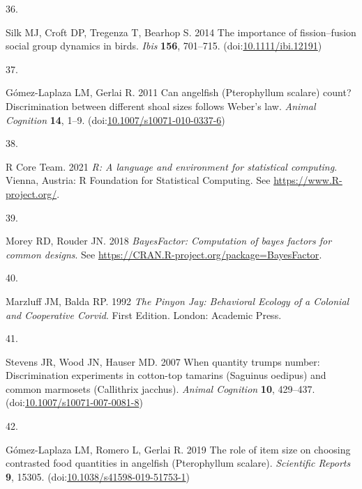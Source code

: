 \documentclass[
  ,doc,floatsintext]{apa6}
\newlength{\cslhangindent}
\newlength{\csllabelwidth}
\newlength{\cslentryspacingunit} %
\newenvironment{CSLReferences}[2] %
 {%
  \setlength{\parindent}{0pt}
  \ifodd #1
  \let\oldpar\par
  \def\par{\hangindent=\cslhangindent\oldpar}
  \fi
  \setlength{\parskip}{#2\cslentryspacingunit}
 }%
 {}
\newcommand{\CSLLeftMargin}[1]{\parbox[t]{\csllabelwidth}{#1}}
\newcommand{\CSLRightInline}[1]{\parbox[t]{\linewidth - \csllabelwidth}{#1}\break}
\begin{document}
\begin{CSLReferences}{0}{0}
\leavevmode{}%
\CSLLeftMargin{36. }%
\CSLRightInline{Silk MJ, Croft DP, Tregenza T, Bearhop S. 2014 The importance of fission--fusion social group dynamics in birds. \emph{Ibis} \textbf{156}, 701--715. (doi:\href{https://doi.org/10.1111/ibi.12191}{10.1111/ibi.12191})}

\leavevmode{}%
\CSLLeftMargin{37. }%
\CSLRightInline{Gómez-Laplaza LM, Gerlai R. 2011 Can angelfish ({Pterophyllum} scalare) count? {Discrimination} between different shoal sizes follows {Weber}'s law. \emph{Animal Cognition} \textbf{14}, 1--9. (doi:\href{https://doi.org/10.1007/s10071-010-0337-6}{10.1007/s10071-010-0337-6})}

\leavevmode{}%
\CSLLeftMargin{38. }%
\CSLRightInline{R Core Team. 2021 \emph{R: A language and environment for statistical computing}. Vienna, Austria: R Foundation for Statistical Computing. See \url{https://www.R-project.org/}.}

\leavevmode{}%
\CSLLeftMargin{39. }%
\CSLRightInline{Morey RD, Rouder JN. 2018 \emph{BayesFactor: Computation of bayes factors for common designs}. See \url{https://CRAN.R-project.org/package=BayesFactor}.}

\leavevmode{}%
\CSLLeftMargin{40. }%
\CSLRightInline{Marzluff JM, Balda RP. 1992 \emph{The {Pinyon} {Jay}: {Behavioral} {Ecology} of a {Colonial} and {Cooperative} {Corvid}}. First Edition. London: Academic Press. }

\leavevmode{}%
\CSLLeftMargin{41. }%
\CSLRightInline{Stevens JR, Wood JN, Hauser MD. 2007 When quantity trumps number: Discrimination experiments in cotton-top tamarins ({Saguinus} oedipus) and common marmosets ({Callithrix} jacchus). \emph{Animal Cognition} \textbf{10}, 429--437. (doi:\href{https://doi.org/10.1007/s10071-007-0081-8}{10.1007/s10071-007-0081-8})}

\leavevmode{}%
\CSLLeftMargin{42. }%
\CSLRightInline{Gómez-Laplaza LM, Romero L, Gerlai R. 2019 The role of item size on choosing contrasted food quantities in angelfish ({Pterophyllum} scalare). \emph{Scientific Reports} \textbf{9}, 15305. (doi:\href{https://doi.org/10.1038/s41598-019-51753-1}{10.1038/s41598-019-51753-1})}

\end{CSLReferences}
\end{document}
